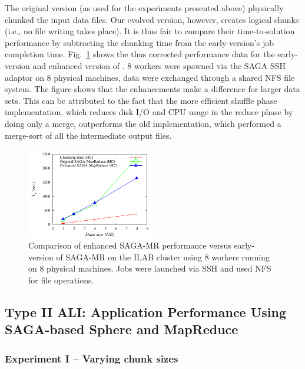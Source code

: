 \documentclass[3p,twocolumn]{elsarticle}
\begin{document}
The original \sagamapreduce version (as used for the experiments
presented above) physically chunked the input data files.  Our evolved
version, however, creates logical chunks (i.e., no file
writing takes place).  It is thus fair to compare their
time-to-solution performance by subtracting the chunking time from the
early-version's job completion time.  Fig.~\ref{fig:sagamr_comparison}
shows the thus corrected performance data for the early-version and
enhanced version of \sagamapreduce.  8 workers were spawned via the
SAGA SSH adaptor on 8 physical machines,  data were exchanged through
a shared NFS file system.  The figure shows that the \sagamapreduce
enhancements make a difference for larger data sets.  This can be
attributed to the fact that the more efficient shuffle phase
implementation, which reduces disk I/O and CPU usage in the reduce
phase by doing only a merge, outperforms the old implementation, which
performed a merge-sort of all the intermediate output files.

\begin{figure}[htb!]
 \includegraphics[width=0.5\textwidth]{figures/sagamr_comparison.pdf}
 \caption{
   Comparison of enhanced SAGA-MR performance versus
   early-version of SAGA-MR on the ILAB cluster using 8 workers running on 8
   physical machines. Jobs were launched via SSH and used NFS for file
   operations.
   \label{fig:sagamr_comparison}
   }
\end{figure}


\subsection{Type II ALI: Application Performance Using SAGA-based
Sphere and MapReduce}

\subsubsection{Experiment I -- Varying chunk sizes}
\end{document}

